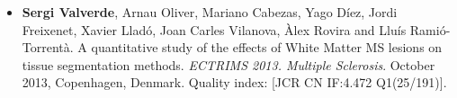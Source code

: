 \begin{itemize}
\item \textbf{Sergi Valverde}, Arnau Oliver, Mariano Cabezas, Yago D\'{i}ez, Jordi Freixenet, Xavier Llad\'{o}, Joan Carles Vilanova, \`{A}lex Rovira and Llu\'{i}s Rami\'{o}-Torrent\`{a}. A quantitative study of the effects of White Matter MS lesions on tissue segmentation methods. \textit{ECTRIMS 2013. Multiple Sclerosis}. October 2013, Copenhagen, Denmark.  Quality index: [JCR CN IF:4.472 Q1(25/191)].



\end{itemize}



